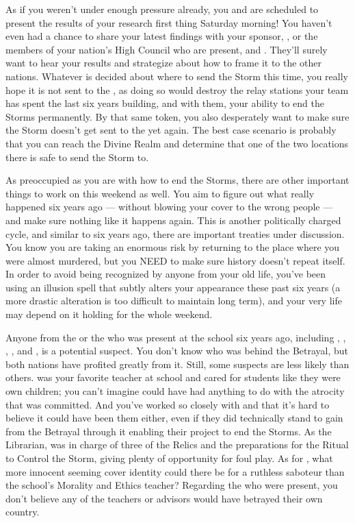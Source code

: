 \documentclass[char]{GL2020}
\begin{document}
As if you weren't under enough pressure already, you and \cHeadScientist{} are scheduled to present the results of your research first thing Saturday morning! You haven't even had a chance to share your latest findings with your sponsor, \cDiplomat{}, or the members of your nation's High Council who are present, \cAntiChup{\full} and \cTechStar{}. They’ll surely want to hear your results and strategize about how to frame it to the other nations. Whatever is decided about where to send the Storm this time, you really hope it is not sent to the \pTech{}, as doing so would destroy the relay stations your team has spent the last six years building, and with them, your ability to end the Storms permanently. By that same token, you also desperately want to make sure the Storm doesn’t get sent to the \pShip{} yet again. The best case scenario is probably that you can reach the Divine Realm and determine that one of the two locations there is safe to send the Storm to.

As preoccupied as you are with how to end the Storms, there are other important things to work on this weekend as well. You aim to figure out what really happened six years ago — without blowing your cover to the wrong people — and make sure nothing like it happens again. This is another politically charged cycle, and similar to six years ago, there are important treaties under discussion. You know you are taking an enormous risk by returning to the place where you were almost murdered, but you NEED to make sure history doesn't repeat itself. In order to avoid being recognized by anyone from your old life, you've been using an illusion spell that subtly alters your appearance these past six years (a more drastic alteration is too difficult to maintain long term), and your very life may depend on it holding for the whole weekend.

Anyone from the \pTech{} or the \pFarm{} who was present at the school six years ago, including \cDiplomat{\full}, \cHeadScientist{\full}, \cMusic{\full}, \cEthics{\full}, and \cLibrarian{\full}, is a potential suspect. You don't know who was behind the Betrayal, but both nations have profited greatly from it. Still, some suspects are less likely than others. \cMusic{} was your favorite teacher at school and \cMusic{\they} cared for \cMusic{\their} students like they were \cMusic{\their} own children; you can't imagine \cMusic{\they} could have had anything to do with the atrocity that was committed. And you've worked so closely with \cHeadScientist{} and \cDiplomat{} that it's hard to believe it could have been them either, even if they did technically stand to gain from the Betrayal through it enabling their project to end the Storms. As the Librarian, \cLibrarian{} was in charge of three of the Relics and the preparations for the Ritual to Control the Storm, giving \cLibrarian{\them} plenty of opportunity for foul play. As for \cEthics{}, what more innocent seeming cover identity could there be for a ruthless saboteur than the school’s Morality and Ethics teacher? Regarding the \pShippies{} who were present, you don't believe any of the teachers or advisors would have betrayed their own country. 
\end{document}
